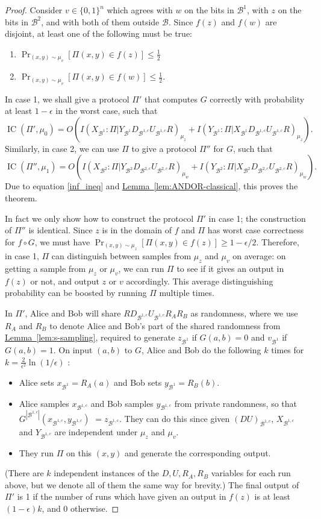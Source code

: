 \documentclass[10pt,a4paper]{article}
\theoremstyle{definition}
\newcommand{\lem}[1]{\hyperref[lem:#1]{Lemma~\ref*{lem:#1}}}
\renewcommand{\>}{\rangle}
\newcommand{\<}{\langle}
\newcommand{\cB}{\mathcal{B}}
\DeclareMathOperator{\IC}{IC}
\begin{document}
\begin{proof}
Consider $v \in \{0,1\}^n$ which agrees with $w$ on the bits in $\cB^1$, with $z$ on the bits in $\cB^2$, and with both of them outside $\cB$. Since $f(z)$ and $f(w)$ are disjoint, at least one of the following must be true:
\begin{enumerate}
    \item $\Pr_{(x,y)\sim \mu_v}[\Pi(x,y) \in f(z)] \leq \frac{1}{2}$
    \item $\Pr_{(x,y)\sim \mu_v}[\Pi(x,y) \in f(w)] \leq \frac{1}{2}$.
\end{enumerate}
In case 1, we shall give a protocol $\Pi'$ that computes $G$ correctly with probability at least $1-\epsilon$ in the worst case, such that
\[\IC(\Pi', \mu_0) = O( I(X_{\cB^1}:\Pi|Y_{\cB^1}D_{\cB^{1,c}}U_{\cB^{1,c}}R)_{\mu_z} + I(Y_{\cB^1}:\Pi|X_{\cB^1}D_{\cB^{1,c}}U_{\cB^{1,c}}R)_{\mu_z}).\]
Similarly, in case 2, we can use $\Pi$ to give a protocol $\Pi''$ for $G$, such that
\[ \IC(\Pi'', \mu_1) = O(I(X_{\cB^2}:\Pi|Y_{\cB^2}D_{\cB^{2,c}}U_{\cB^{2,c}}R)_{\mu_w} + I(Y_{\cB^2}:\Pi|X_{\cB^2}D_{\cB^{2,c}}U_{\cB^{2,c}}R)_{\mu_w}).\]
Due to equation \eqref{inf_ineq} and \lem{ANDOR-classical}, this proves the theorem.

In fact we only show how to construct the protocol $\Pi'$ in case 1; the construction of $\Pi''$ is identical. Since $z$ is in the domain of $f$ and $\Pi$ has worst case correctness for $f\circ G$, we must have $\Pr_{(x,y)\sim\mu_z}[\Pi(x,y) \in f(z)] \geq 1-\epsilon/2$. Therefore, in case 1, $\Pi$ can distinguish between samples from $\mu_z$ and $\mu_v$ on average: on getting a sample from $\mu_z$ or $\mu_v$, we can run $\Pi$ to see if it gives an output in $f(z)$ or not, and output $z$ or $v$ accordingly. This average distinguishing probability can be boosted by running $\Pi$ multiple times. 

In $\Pi'$, Alice and Bob will share $RD_{\cB^{1,c}}U_{\cB^{1,c}}R_AR_B$ as randomness, where we use $R_A$ and $R_B$ to denote Alice and Bob's part of the shared randomness from  \lem{s-sampling}, required to generate $z_{\cB^1}$ if $G(a,b)=0$ and $v_{\cB^1}$ if $G(a,b)=1$. On input $(a,b)$ to $G$, Alice and Bob do the following $k$ times for $k=\frac{2}{\epsilon^2}\ln(1/\epsilon)$ :
\begin{itemize}
\item Alice sets $x_{\cB^1} = R_A(a)$ and Bob sets $y_{\cB^1} = R_B(b)$.
\item Alice samples $x_{\cB^{1,c}}$ and Bob samples $y_{\cB^{1,c}}$ from private randomness, so that $G^{|\cB^{1,c}|}(x_{\cB^{1,c}},y_{\cB^{1,c}})$ $= z_{\cB^{1,c}}$. They can do this since given $(DU)_{\cB^{1,c}}$, $X_{\cB^{1,c}}$ and $Y_{\cB^{1,c}}$ are independent under $\mu_z$ and $\mu_v$.
\item They run $\Pi$ on this $(x,y)$ and generate the corresponding output.
\end{itemize}
(There are $k$ independent instances of the $D, U, R_A, R_B$ variables for each run above, but we denote all of them the same way for brevity.) The final output of $\Pi'$ is 1 if the number of runs which have given an output in $f(z)$ is at least $(1-\epsilon)k$, and 0 otherwise.


\end{proof}
\end{document}
